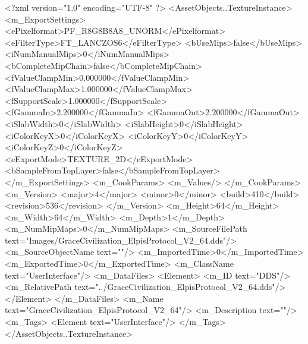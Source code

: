 <?xml version="1.0" encoding="UTF-8" ?>
<AssetObjects..TextureInstance>
	<m_ExportSettings>
		<ePixelformat>PF_R8G8B8A8_UNORM</ePixelformat>
		<eFilterType>FT_LANCZOS6</eFilterType>
		<bUseMips>false</bUseMips>
		<iNumManualMips>0</iNumManualMips>
		<bCompleteMipChain>false</bCompleteMipChain>
		<fValueClampMin>0.000000</fValueClampMin>
		<fValueClampMax>1.000000</fValueClampMax>
		<fSupportScale>1.000000</fSupportScale>
		<fGammaIn>2.200000</fGammaIn>
		<fGammaOut>2.200000</fGammaOut>
		<iSlabWidth>0</iSlabWidth>
		<iSlabHeight>0</iSlabHeight>
		<iColorKeyX>0</iColorKeyX>
		<iColorKeyY>0</iColorKeyY>
		<iColorKeyZ>0</iColorKeyZ>
		<eExportMode>TEXTURE_2D</eExportMode>
		<bSampleFromTopLayer>false</bSampleFromTopLayer>
	</m_ExportSettings>
	<m_CookParams>
		<m_Values/>
	</m_CookParams>
	<m_Version>
		<major>4</major>
		<minor>0</minor>
		<build>410</build>
		<revision>536</revision>
	</m_Version>
	<m_Height>64</m_Height>
	<m_Width>64</m_Width>
	<m_Depth>1</m_Depth>
	<m_NumMipMaps>0</m_NumMipMaps>
	<m_SourceFilePath text="Images/GraceCivilization_ElpisProtocol_V2_64.dds"/>
	<m_SourceObjectName text=""/>
	<m_ImportedTime>0</m_ImportedTime>
	<m_ExportedTime>0</m_ExportedTime>
	<m_ClassName text="UserInterface"/>
	<m_DataFiles>
		<Element>
			<m_ID text="DDS"/>
			<m_RelativePath text="../GraceCivilization_ElpisProtocol_V2_64.dds"/>
		</Element>
	</m_DataFiles>
	<m_Name text="GraceCivilization_ElpisProtocol_V2_64"/>
	<m_Description text=""/>
	<m_Tags>
		<Element text="UserInterface"/>
	</m_Tags>
</AssetObjects..TextureInstance>
